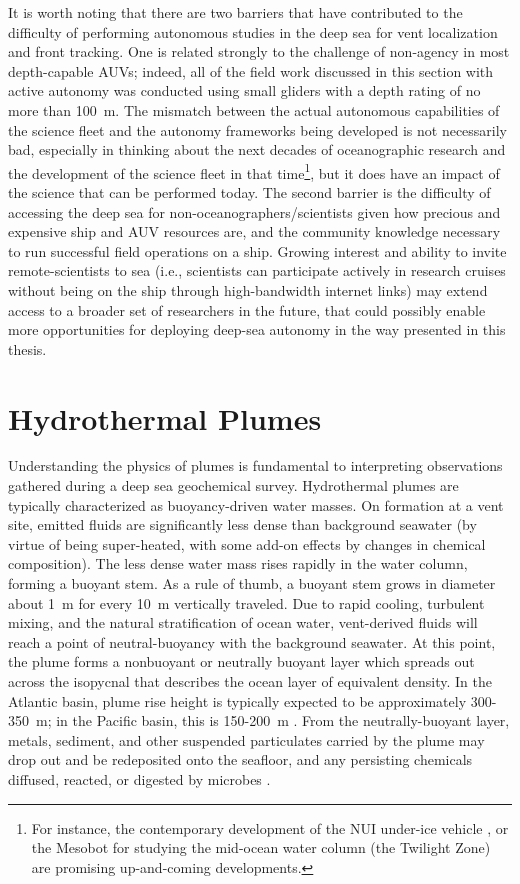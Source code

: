 It is worth noting that there are two barriers that have contributed to the difficulty of performing autonomous studies in the deep sea for vent localization and front tracking. One is related strongly to the challenge of non-agency in most depth-capable AUVs; indeed, all of the field work discussed in this section with active autonomy was conducted using small gliders with a depth rating of no more than \SI{100}{\meter}. The mismatch between the actual autonomous capabilities of the science fleet and the autonomy frameworks being developed is not necessarily bad, especially in thinking about the next decades of oceanographic research and the development of the science fleet in that time\footnote{For instance, the contemporary development of the NUI under-ice vehicle \autocite{german2019robotics}, or the Mesobot for studying the mid-ocean water column (the Twilight Zone) \autocite{yoerger2018mesobot} are promising up-and-coming developments.}, but it does have an impact of the science that can be performed today. The second barrier is the difficulty of accessing the deep sea for non-oceanographers/scientists given how precious and expensive ship and AUV resources are, and the community knowledge necessary to run successful field operations on a ship. Growing interest and ability to invite remote-scientists to sea (i.e., scientists can participate actively in research cruises without being on the ship through high-bandwidth internet links) may extend access to a broader set of researchers in the future, that could possibly enable more opportunities for deploying deep-sea autonomy in the way presented in this thesis.  


\section{Hydrothermal Plumes}
\label{sec:rw_plumes}
Understanding the physics of plumes is fundamental to interpreting observations gathered during a deep sea geochemical survey. Hydrothermal plumes are typically characterized as buoyancy-driven water masses. On formation at a vent site, emitted fluids are significantly less dense than background seawater (by virtue of being super-heated, with some add-on effects by changes in chemical composition). The less dense water mass rises rapidly in the water column, forming a buoyant stem. As a rule of thumb, a buoyant stem grows in diameter about \SI{1}{\meter} for every \SI{10}{\meter} vertically traveled. Due to rapid cooling, turbulent mixing, and the natural stratification of ocean water, vent-derived fluids will reach a point of neutral-buoyancy with the background seawater. At this point, the plume forms a nonbuoyant or neutrally buoyant layer which spreads out across the isopycnal that describes the ocean layer of equivalent density. In the Atlantic basin, plume rise height is typically expected to be approximately 300-\SI{350}{\meter}; in the Pacific basin, this is 150-\SI{200}{\meter} \autocite{speer1989model}. From the neutrally-buoyant layer, metals, sediment, and other suspended particulates carried by the plume may drop out and be redeposited onto the seafloor, and any persisting chemicals diffused, reacted, or digested by microbes \autocite{scholz2019shelf,dick2013microbiology}.

